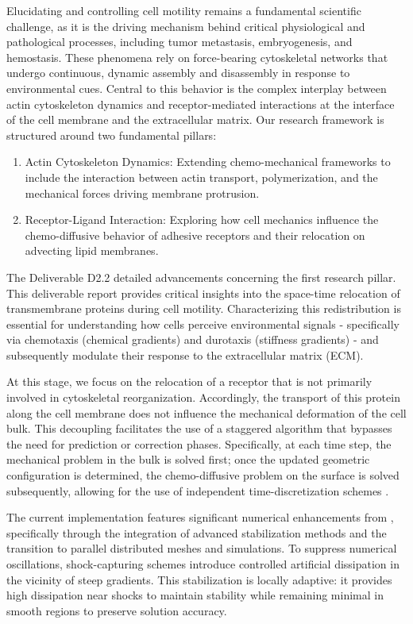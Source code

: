 \documentclass[a4paper,12pt]{article}
\begin{document}
Elucidating and controlling cell motility remains a fundamental scientific challenge, as it is the driving mechanism behind critical physiological and pathological processes, including tumor metastasis, embryogenesis, and hemostasis. These phenomena rely on force-bearing cytoskeletal networks that undergo continuous, dynamic assembly and disassembly in response to environmental cues. Central to this behavior is the complex interplay between actin cytoskeleton dynamics and receptor-mediated interactions at the interface of the cell membrane and the extracellular matrix. Our research framework is structured around two fundamental pillars:
\begin{enumerate}
    \item Actin Cytoskeleton Dynamics: Extending chemo-mechanical frameworks to include the interaction between actin transport, polymerization, and the mechanical forces driving membrane protrusion.
    \item Receptor-Ligand Interaction: Exploring how cell mechanics influence the che\-mo-diffusive behavior of adhesive receptors and their relocation on advecting lipid membranes.
\end{enumerate}
The Deliverable D2.2 detailed advancements concerning the first research pillar. This deliverable report provides critical insights into the space-time relocation of transmembrane proteins during cell motility. Characterizing this redistribution is essential for understanding how cells perceive environmental signals - specifically via chemotaxis (chemical gradients) and durotaxis (stiffness gradients) - and subsequently modulate their response to the extracellular matrix (ECM).

At this stage, we focus on the relocation of a receptor that is not primarily involved in cytoskeletal reorganization. Accordingly, the transport of this protein along the cell membrane does not influence the mechanical deformation of the cell bulk. This decoupling facilitates the use of a staggered algorithm that bypasses the need for prediction or correction phases. Specifically, at each time step, the mechanical problem in the bulk is solved first; once the updated geometric configuration is determined, the chemo-diffusive problem on the surface is solved subsequently, allowing for the use of independent time-discretization schemes \citep{martins2017new}.

The current implementation features significant numerical enhancements from \citet{serpelloni2023mechanobiology}, specifically through the integration of advanced stabilization methods and the transition to parallel distributed meshes and simulations. To suppress numerical oscillations, shock-capturing schemes introduce controlled artificial dissipation in the vicinity of steep gradients. This stabilization is locally adaptive: it provides high dissipation near shocks to maintain stability while remaining minimal in smooth regions to preserve solution accuracy.
\end{document}

